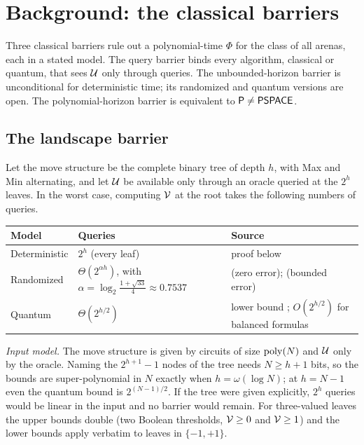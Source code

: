 \section{Background: the classical barriers}\label{sec:barriers}

Three classical barriers rule out a polynomial-time $\Phi$ for the class of all arenas, each in a stated model. The query barrier binds every algorithm, classical or quantum, that sees $\mathcal{U}$ only through queries. The unbounded-horizon barrier is unconditional for deterministic time; its randomized and quantum versions are open. The polynomial-horizon barrier is equivalent to $\mathsf{P}\neq\mathsf{PSPACE}$.

\subsection{The landscape barrier}

\begin{theorem}\label{thm:query}
Let the move structure be the complete binary tree of depth $h$, with Max and Min alternating, and let $\mathcal{U}$ be available only through an oracle queried at the $2^h$ leaves. In the worst case, computing $\mathcal{V}$ at the root takes the following numbers of queries.
\begin{center}\small
\begin{tabularx}{\linewidth}{@{}l>{\raggedright\arraybackslash}X>{\raggedright\arraybackslash}X@{}}
\toprule
Model & Queries & Source\\ \midrule
Deterministic & $2^h$ (every leaf) & proof below\\
Randomized & $\Theta(2^{\alpha h})$, with $\alpha=\log_2\frac{1+\sqrt{33}}{4}\approx 0.7537$ & \cite{Snir,SaksWigderson} (zero error); \cite{Santha} (bounded error)\\
Quantum & $\Theta(2^{h/2})$ & lower bound \cite{BarnumSaks}; $O(2^{h/2})$ for balanced formulas \cite{ACRSZ,ReichardtSpalek}\\
\bottomrule
\end{tabularx}
\end{center}
\end{theorem}

\noindent\emph{Input model.} The move structure is given by circuits of size $\operatorname{poly}(N)$ and $\mathcal{U}$ only by the oracle. Naming the $2^{h+1}-1$ nodes of the tree needs $N\ge h+1$ bits, so the bounds are super-polynomial in $N$ exactly when $h=\omega(\log N)$; at $h=N-1$ even the quantum bound is $2^{(N-1)/2}$. If the tree were given explicitly, $2^h$ queries would be linear in the input and no barrier would remain. For three-valued leaves the upper bounds double (two Boolean thresholds, $\mathcal{V}\ge 0$ and $\mathcal{V}\ge1$) and the lower bounds apply verbatim to leaves in $\{-1,+1\}$.

